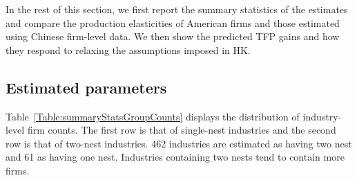 \documentclass[12pt]{article}
\begin{document}
In the rest of this section, we first report the summary statistics of the estimates and compare the production elasticities of American firms and those estimated using Chinese firm-level data. We then show the predicted TFP gains and how they respond to relaxing the assumptions imposed in HK. 

\subsection{Estimated parameters} \label{sec:estimatorResults}
Table~\ref{Table:summaryStatsGroupCounts} displays the distribution of industry-level firm counts. The first row is that of single-nest industries and the second row is that of two-nest industries. 462 industries are estimated as having two nest and 61 as having one nest. Industries containing two nests tend to contain more firms. 





\end{document}
